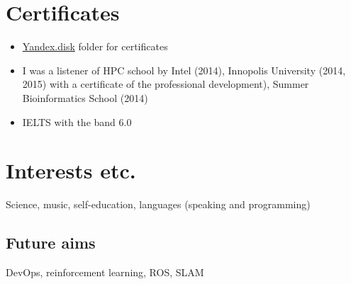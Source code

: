 \documentclass[letterpaper]{twentysecondcv} %
\begin{document}
\section{Certificates}
    {\begin{itemize}
        \item \href{https://yadi.sk/d/aSyzcZ44-_l-8w?w=1}{Yandex.disk} folder for certificates
        \item I was a listener of HPC school by Intel (2014), Innopolis University (2014, 2015) with a certificate of the professional development),
        Summer Bioinformatics School (2014)
        \item IELTS with the band 6.0
    \end{itemize}}

\section{Interests etc.}

Science, music, self-education, languages (speaking and programming)

\subsection{Future aims}

DevOps, reinforcement learning, ROS, SLAM







\end{document}
